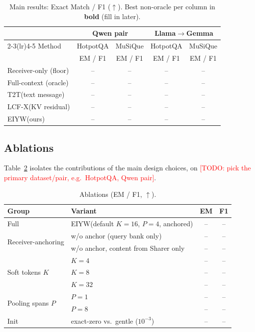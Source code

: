 \documentclass[11pt]{article}
\newcommand{\method}{\textsc{EIYW}\xspace}      %
\newcommand{\lcfx}{\textsc{LCF-X}\xspace}        %
\newcommand{\ttt}{\textsc{T2T}\xspace}           %
\newcommand{\sharer}{\textsf{Sharer}\xspace}
\newcommand{\TODO}[1]{\textcolor{red}{[TODO: #1]}}
\newcommand{\res}{--}                             %
\begin{document}
\begin{table}[h]
  \centering
  \caption{Main results: Exact Match / F1 ($\uparrow$). Best non-oracle per
  column in \textbf{bold} (fill in later).}
  \label{tab:main}
  \setlength{\tabcolsep}{5pt}
  \begin{tabular}{l cc cc}
    \toprule
    & \multicolumn{2}{c}{Qwen pair} & \multicolumn{2}{c}{Llama$\rightarrow$Gemma} \\
    \cmidrule(lr){2-3}\cmidrule(lr){4-5}
    Method & HotpotQA & MuSiQue & HotpotQA & MuSiQue \\
           & {\small EM / F1} & {\small EM / F1} & {\small EM / F1} & {\small EM / F1} \\
    \midrule
    Receiver-only (floor)      & \res & \res & \res & \res \\
    Full-context (oracle)      & \res & \res & \res & \res \\
    \midrule
    \ttt (text message)        & \res & \res & \res & \res \\
    \lcfx (KV residual)        & \res & \res & \res & \res \\
    \method (ours)             & \res & \res & \res & \res \\
    \bottomrule
  \end{tabular}
\end{table}

\subsection{Ablations}
Table~\ref{tab:ablation} isolates the contributions of the main design choices,
on \TODO{pick the primary dataset/pair, e.g.\ HotpotQA, Qwen pair}.

\begin{table}[h]
  \centering
  \caption{Ablations (EM / F1, $\uparrow$).}
  \label{tab:ablation}
  \begin{tabular}{ll cc}
    \toprule
    Group & Variant & EM & F1 \\
    \midrule
    \multirow{1}{*}{Full} & \method (default $K{=}16$, $P{=}4$, anchored) & \res & \res \\
    \midrule
    \multirow{2}{*}{Receiver-anchoring}
       & w/o anchor (query bank only)        & \res & \res \\
       & w/o anchor, content from \sharer only & \res & \res \\
    \midrule
    \multirow{3}{*}{Soft tokens $K$}
       & $K=4$   & \res & \res \\
       & $K=8$   & \res & \res \\
       & $K=32$  & \res & \res \\
    \midrule
    \multirow{2}{*}{Pooling spans $P$}
       & $P=1$ & \res & \res \\
       & $P=8$ & \res & \res \\
    \midrule
    \multirow{1}{*}{Init} & exact-zero vs.\ gentle ($10^{-3}$) & \res & \res \\
    \bottomrule
  \end{tabular}
\end{table}
\end{document}
